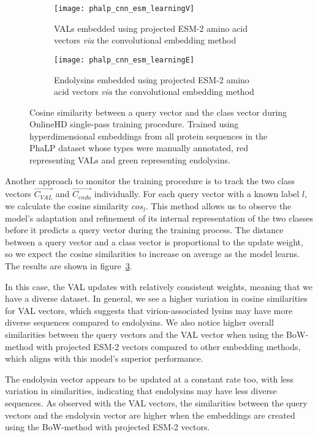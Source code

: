\begin{figure}[htbp]
    \begin{subfigure}{0.48\textwidth}
        \texttt{[image: phalp\_cnn\_esm\_learningV]}
        \caption{VALs embedded using projected ESM-2 amino acid vectors \textit{via} the convolutional embedding method}
        \label{fig:subfig-g}
    \end{subfigure}
    \hfill
    \begin{subfigure}{0.48\textwidth}
        \texttt{[image: phalp\_cnn\_esm\_learningE]}
        \caption{Endolysins embedded using projected ESM-2 amino acid vectors \textit{via} the convolutional embedding method}
        \label{fig:subfig-h}
    \end{subfigure}
    
    \caption{Cosine similarity between a query vector and the class vector during OnlineHD single-pass training procedure. Trained using hyperdimensional embeddings from all protein sequences in the PhaLP dataset whose types were manually annotated, red representing VALs and green representing endolysins.}
    \label{fig:main}
\end{figure}

Another approach to monitor the training procedure is to track the two class vectors $\vec{C_{VAL}}$ and $\vec{C_{endo}}$ individually. For each query vector with a known label $l$, we calculate the cosine similarity $cos_{l}$. This method allows us to observe the model's adaptation and refinement of its internal representation of the two classes before it predicts a query vector during the training process. The distance between a query vector and a class vector is proportional to the update weight, so we expect the cosine similarities to increase on average as the model learns. The results are shown in figure~\ref{fig:main}.

In this case, the VAL updates with relatively consistent weights, meaning that we have a diverse dataset. In general, we see a higher variation in cosine similarities for VAL vectors, which suggests that virion-associated lysins may have more diverse sequences compared to endolysins. We also notice higher overall similarities between the query vectors and the VAL vector when using the BoW-method with projected ESM-2 vectors compared to other embedding methods, which aligns with this model's superior performance.

The endolysin vector appears to be updated at a constant rate too, with less variation in similarities, indicating that endolysins may have less diverse sequences. As observed with the VAL vectors, the similarities between the query vectors and the endolysin vector are higher when the embeddings are created using the BoW-method with projected ESM-2 vectors.

